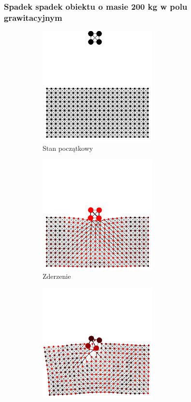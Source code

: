 \documentclass[12pt, letterpaper]{report}
\begin{document}
    \subsubsection{Spadek spadek obiektu o masie 200 kg w polu grawitacyjnym}
    \begin{figure}[h]

        \begin{subfigure}{0.5\textwidth}
            \centering
            \includegraphics[width=6cm, height=6cm]{collision_2x2_24x12_mass50_1} 
            \caption{Stan początkowy}
        \end{subfigure}
        \begin{subfigure}{0.5\textwidth}
            \centering
            \includegraphics[width=6cm, height=6cm]{collision_2x2_24x12_mass50_2}
            \caption{Zderzenie}
        \end{subfigure}
        \begin{subfigure}{0.5\textwidth}
            \centering
            \includegraphics[width=6cm, height=6cm]{collision_2x2_24x12_mass50_3}

\end{subfigure}
\end{figure}
\end{document}
